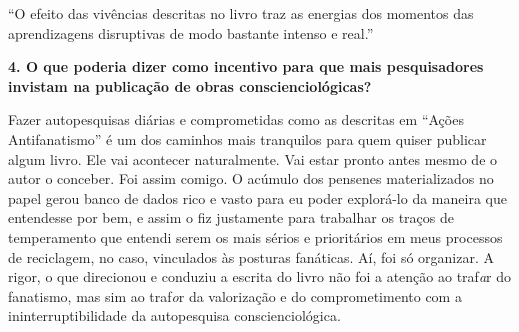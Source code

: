 \documentclass{gescons}
\begin{document}
\begin{multicols}{2}
\begin{pullquote}
``O efeito das vivências descritas no livro traz as energias dos momentos das aprendizagens disruptivas de modo bastante intenso e real.''
\end{pullquote}


\textbf{4.       O que poderia dizer como incentivo para que mais pesquisadores invistam na publicação de obras conscienciológicas?}

Fazer autopesquisas diárias e comprometidas como as descritas em “Ações Antifanatismo” é um dos caminhos mais tranquilos para quem quiser publicar algum livro. Ele vai acontecer naturalmente. Vai estar pronto antes mesmo de o autor o conceber. Foi assim comigo. O acúmulo dos pensenes materializados no papel gerou banco de dados rico e vasto para eu poder explorá-lo da maneira que entendesse por bem, e assim o fiz justamente para trabalhar os traços de temperamento que entendi serem os mais sérios e prioritários em meus processos de reciclagem, no caso, vinculados às posturas fanáticas. Aí, foi só organizar. A rigor, o que direcionou e conduziu a escrita do livro não foi a atenção ao traf\textit{a}r do fanatismo, mas sim ao traf\textit{o}r da valorização e do comprometimento com a ininterruptibilidade da autopesquisa conscienciológica.


    
    
    \end{multicols}
\end{document}
